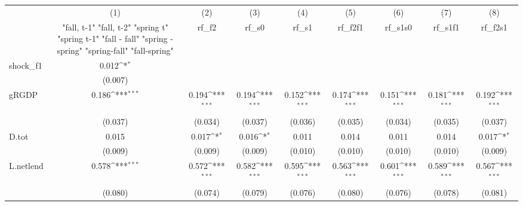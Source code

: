 {
\def\sym#1{\ifmmode^{#1}\else\(^{#1}\)\fi}
\begin{tabular}{l*{8}{c}}
\toprule
            &\multicolumn{1}{c}{(1)}&\multicolumn{1}{c}{(2)}&\multicolumn{1}{c}{(3)}&\multicolumn{1}{c}{(4)}&\multicolumn{1}{c}{(5)}&\multicolumn{1}{c}{(6)}&\multicolumn{1}{c}{(7)}&\multicolumn{1}{c}{(8)}\\
            &\multicolumn{1}{c}{  "fall, t-1" "fall, t-2" "spring t" "spring t-1"  "fall - fall" "spring - spring" "spring-fall" "fall-spring" }&\multicolumn{1}{c}{rf\_f2}&\multicolumn{1}{c}{rf\_s0}&\multicolumn{1}{c}{rf\_s1}&\multicolumn{1}{c}{rf\_f2f1}&\multicolumn{1}{c}{rf\_s1s0}&\multicolumn{1}{c}{rf\_s1f1}&\multicolumn{1}{c}{rf\_f2s1}\\
\midrule
shock\_f1    &       0.012\sym{*}  &                     &                     &                     &                     &                     &                     &                     \\
            &     (0.007)         &                     &                     &                     &                     &                     &                     &                     \\
\addlinespace
gRGDP       &       0.186\sym{***}&       0.194\sym{***}&       0.194\sym{***}&       0.152\sym{***}&       0.174\sym{***}&       0.151\sym{***}&       0.181\sym{***}&       0.192\sym{***}\\
            &     (0.037)         &     (0.034)         &     (0.037)         &     (0.036)         &     (0.035)         &     (0.034)         &     (0.035)         &     (0.037)         \\
\addlinespace
D.tot       &       0.015         &       0.017\sym{*}  &       0.016\sym{*}  &       0.011         &       0.014         &       0.011         &       0.014         &       0.017\sym{*}  \\
            &     (0.009)         &     (0.009)         &     (0.009)         &     (0.010)         &     (0.010)         &     (0.010)         &     (0.010)         &     (0.009)         \\
\addlinespace
L.netlend   &       0.578\sym{***}&       0.572\sym{***}&       0.582\sym{***}&       0.595\sym{***}&       0.563\sym{***}&       0.601\sym{***}&       0.589\sym{***}&       0.567\sym{***}\\
            &     (0.080)         &     (0.074)         &     (0.079)         &     (0.076)         &     (0.080)         &     (0.076)         &     (0.078)         &     (0.081)         \\

\end{tabular}}
